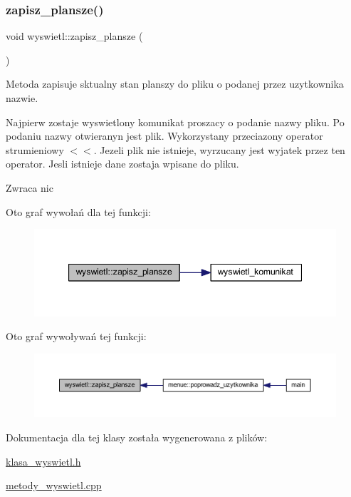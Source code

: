 \subsubsection{\texorpdfstring{zapisz\+\_\+plansze()}{zapisz\_plansze()}}
{\footnotesize\ttfamily void wyswietl\+::zapisz\+\_\+plansze (\begin{DoxyParamCaption}{ }\end{DoxyParamCaption})}

Metoda zapisuje sktualny stan planszy do pliku o podanej przez uzytkownika nazwie.

Najpierw zostaje wyswietlony komunikat proszacy o podanie nazwy pliku. Po podaniu nazwy otwieranyn jest plik. Wykorzystany przeciazony operator strumieniowy $<$$<$. Jezeli plik nie istnieje, wyrzucany jest wyjatek przez ten operator. Jesli istnieje dane zostaja wpisane do pliku. \begin{DoxyReturn}{Zwraca}
nic 
\end{DoxyReturn}
Oto graf wywołań dla tej funkcji\+:
\nopagebreak
\begin{figure}[H]
\begin{center}
\leavevmode
\includegraphics[width=347pt]{classwyswietl_ac772602890ae0255a8ecc616f214b3db_cgraph}
\end{center}
\end{figure}
Oto graf wywoływań tej funkcji\+:
\nopagebreak
\begin{figure}[H]
\begin{center}
\leavevmode
\includegraphics[width=350pt]{classwyswietl_ac772602890ae0255a8ecc616f214b3db_icgraph}
\end{center}
\end{figure}


Dokumentacja dla tej klasy została wygenerowana z plików\+:\begin{DoxyCompactItemize}
\item 
\mbox{\hyperlink{klasa__wyswietl_8h}{klasa\+\_\+wyswietl.\+h}}\item 
\mbox{\hyperlink{metody__wyswietl_8cpp}{metody\+\_\+wyswietl.\+cpp}}\end{DoxyCompactItemize}
